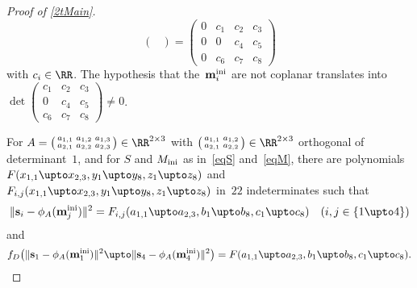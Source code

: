 \documentclass[reqno]{amsart}
\begin{document}
\begin{proof}[Proof of \cref{2tMain}]
\begin{equation}
\begin{pmatrix}
    \end{pmatrix} =
    \begin{pmatrix}
      0 & c_1 & c_2 & c_3 \\
      0 & 0 & c_4 & c_5 \\
      0 & c_6 & c_7 & c_8
    \end{pmatrix}    
  \end{equation}
  with $c_i \in \RR$. The hypothesis that the~$\mathbf{m}_i^{\operatorname{ini}}$ are not
  coplanar translates into $\det\left(\begin{smallmatrix} c_1 & c_2 &
      c_3 \\ 0 & c_4 & c_5 \\ c_6 & c_7 & c_8\end{smallmatrix}\right)
  \ne 0$.

  For $A = \left(\begin{smallmatrix} a_{1,1} & a_{1,2} & a_{1,3} \\
      a_{2,1} & a_{2,2} & a_{2,3}\end{smallmatrix}\right) \in \RR^{2
    \times 3}$ with
  $\left(\begin{smallmatrix} a_{1,1} & a_{1,2} \\ a_{2,1} &
      a_{2,2}\end{smallmatrix}\right) \in \RR^{2 \times 3}$ orthogonal
  of determinant~$1$, and for $S$ and $M_{\operatorname{ini}}$ as in~\eqref{eqS}
  and~\eqref{eqM}, there are polynomials
  $F(x_{1,1} \upto x_{2,3},y_1 \upto y_8,z_1 \upto z_8)$ and
  $F_{i,j}(x_{1,1} \upto x_{2,3},y_1 \upto y_8,z_1 \upto z_8)$ in~$22$
  indeterminates such that
  \[
    \lVert\ve s_i - \phi_A(\ve m_j^\ini)\rVert^2 = F_{i,j}(a_{1,1}
    \upto a_{2,3},b_1 \upto b_8,c_1 \upto c_8) \quad (i,j \in \{1
    \upto 4\})
  \]
  and
  \[
    f_D\bigl(\lVert\ve s_1 - \phi_A(\ve m_1^\ini)\rVert^2 \upto
    \lVert\ve s_4 - \phi_A(\ve m_4^\ini)\rVert^2\bigr) = F(a_{1,1}
    \upto a_{2,3},b_1 \upto b_8,c_1 \upto c_8).
  \]

\end{proof}
\end{document}
